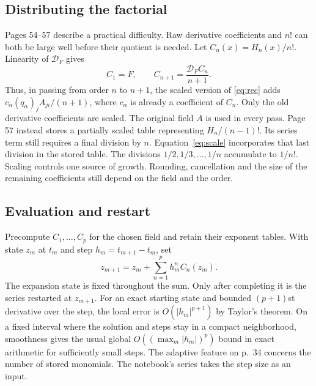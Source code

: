 \documentclass[11pt,letterpaper]{article}
\newcommand{\D}{\mathcal{D}_F}
\begin{document}
\subsection{Distributing the factorial}
Pages 54--57 describe a practical difficulty. Raw derivative coefficients and
\(n!\) can both be large well before their quotient is needed. Let
\(C_n(x)=H_n(x)/n!\). Linearity of \(\D\) gives
\begin{equation}\label{eq:scale}
 C_1=F,\qquad C_{n+1}=\frac{\D C_n}{n+1}.
\end{equation}
Thus, in passing from order \(n\) to \(n+1\), the scaled version of
\eqref{eq:rec} adds \(c_\alpha(q_\alpha)_j A_{ji}/(n+1)\), where
\(c_\alpha\) is already a coefficient of \(C_n\). Only the old derivative
coefficients are scaled. The original field \(A\) is used in every pass.
Page 57 instead stores a partially scaled table representing
\(H_n/(n-1)!\). Its series term still requires a final division by \(n\).
Equation~\eqref{eq:scale} incorporates that last division in the stored table.
The divisions \(1/2,1/3,\ldots,1/n\) accumulate to \(1/n!\).
Scaling controls one source of growth. Rounding, cancellation and the size of
the remaining coefficients still depend on the field and the order.

\subsection{Evaluation and restart}
Precompute \(C_1,\ldots,C_p\) for the chosen field and retain their exponent
tables. With state \(z_m\) at \(t_m\) and step \(h_m=t_{m+1}-t_m\), set
\begin{equation}\label{eq:step}
 \boxed{\displaystyle z_{m+1}=z_m+\sum_{n=1}^{p}h_m^n C_n(z_m).}
\end{equation}
The expansion state is fixed throughout the sum. Only after completing it is
the series restarted at \(z_{m+1}\). For an exact starting state and bounded
\((p+1)\)st derivative over the step, the local error is \(O(|h_m|^{p+1})\)
by Taylor's theorem. On a fixed interval where the solution and steps stay in
a compact neighborhood, smoothness gives the usual global
\(O((\max_m |h_m|)^p)\) bound in exact arithmetic for sufficiently small steps.
The adaptive feature on p.~34 concerns the number of stored monomials. The
notebook's series takes the step size as an input.
\end{document}
